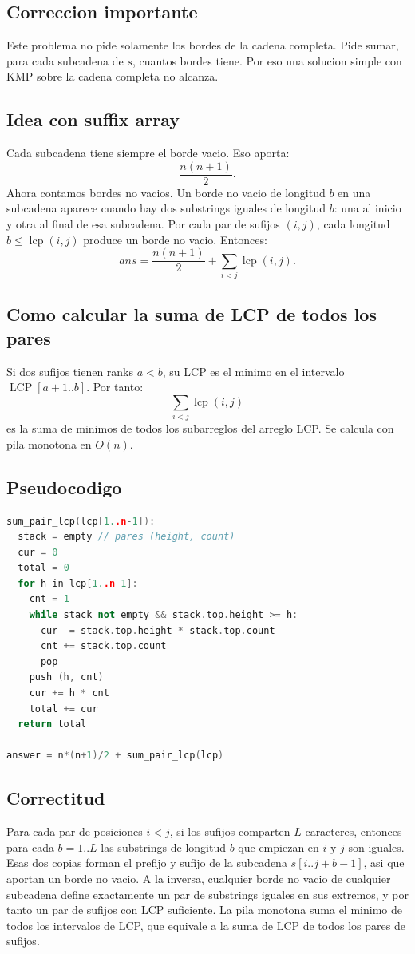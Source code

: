 \documentclass[10pt]{article}
\newcommand{\bigO}{O}
\newcommand{\LCP}{\operatorname{LCP}}
\newcommand{\lcp}{\operatorname{lcp}}
\begin{document}
\subsection{Correccion importante}
Este problema no pide solamente los bordes de la cadena completa. Pide sumar,
para cada subcadena de $s$, cuantos bordes tiene. Por eso una solucion simple
con KMP sobre la cadena completa no alcanza.

\subsection{Idea con suffix array}
Cada subcadena tiene siempre el borde vacio. Eso aporta:
\[
\frac{n(n+1)}2.
\]
Ahora contamos bordes no vacios. Un borde no vacio de longitud $b$ en una
subcadena aparece cuando hay dos substrings iguales de longitud $b$: una al
inicio y otra al final de esa subcadena. Por cada par de sufijos $(i,j)$, cada
longitud $b\le \lcp(i,j)$ produce un borde no vacio. Entonces:
\[
ans=\frac{n(n+1)}2+\sum_{i<j}\lcp(i,j).
\]

\subsection{Como calcular la suma de LCP de todos los pares}
Si dos sufijos tienen ranks $a<b$, su LCP es el minimo en el intervalo
$\LCP[a+1..b]$. Por tanto:
\[
\sum_{i<j}\lcp(i,j)
\]
es la suma de minimos de todos los subarreglos del arreglo LCP. Se calcula con
pila monotona en $\bigO(n)$.

\subsection{Pseudocodigo}
\begin{lstlisting}[language=C++]
sum_pair_lcp(lcp[1..n-1]):
  stack = empty // pares (height, count)
  cur = 0
  total = 0
  for h in lcp[1..n-1]:
    cnt = 1
    while stack not empty && stack.top.height >= h:
      cur -= stack.top.height * stack.top.count
      cnt += stack.top.count
      pop
    push (h, cnt)
    cur += h * cnt
    total += cur
  return total

answer = n*(n+1)/2 + sum_pair_lcp(lcp)
\end{lstlisting}

\subsection{Correctitud}
Para cada par de posiciones $i<j$, si los sufijos comparten $L$ caracteres,
entonces para cada $b=1..L$ las substrings de longitud $b$ que empiezan en $i$
y $j$ son iguales. Esas dos copias forman el prefijo y sufijo de la subcadena
$s[i..j+b-1]$, asi que aportan un borde no vacio. A la inversa, cualquier borde
no vacio de cualquier subcadena define exactamente un par de substrings iguales
en sus extremos, y por tanto un par de sufijos con LCP suficiente. La pila
monotona suma el minimo de todos los intervalos de LCP, que equivale a la suma
de LCP de todos los pares de sufijos.
\end{document}
